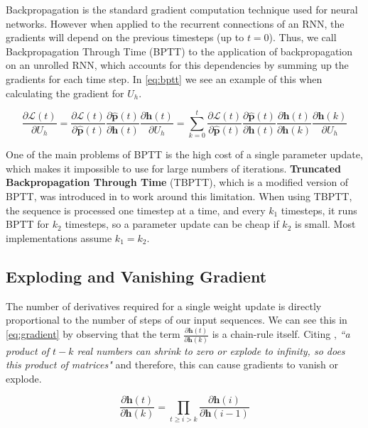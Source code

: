 Backpropagation is the standard gradient computation technique used for neural networks. However when applied to the recurrent connections of an RNN, the gradients will depend on the previous timesteps (up to $t=0$). Thus, we call Backpropagation Through Time (BPTT) \cite{werbos1990backpropagation} to the application of backpropagation on an unrolled RNN, which accounts for this dependencies by summing up the gradients for each time step. In \autoref{eq:bptt} we see an example of this when calculating the gradient for $U_h$.

\begin{equation} \label{eq:bptt}
\frac{\partial \mathcal{L}(t)}{\partial U_h} = \frac{\partial \mathcal{L}(t)}{\partial \mathbf{\hat{p}}(t)}\frac{\partial \mathbf{\hat{p}}(t)}{\partial \mathbf{h}(t)}\frac{\partial \mathbf{h}(t)}{\partial U_h} = \sum_{k=0}^{t} \frac{\partial \mathcal{L}(t)}{\partial \mathbf{\hat{p}}(t)}\frac{\partial \mathbf{\hat{p}}(t)}{\partial \mathbf{h}(t)}\frac{\partial \mathbf{h}(t)}{\partial \mathbf{h}(k)}\frac{\partial \mathbf{h}(k)}{\partial U_h}
\end{equation}

One of the main problems of BPTT is the high cost of a single parameter update, which makes it impossible to use for large numbers of iterations. \textbf{Truncated Backpropagation Through Time} (TBPTT), which is a modified version of BPTT, was introduced in \cite{sutskever2013training} to work around this limitation. When using TBPTT, the sequence is processed one timestep at a time, and every $k_1$ timesteps, it runs BPTT for $k_2$ timesteps, so a parameter update can be cheap if $k_2$ is small. Most implementations assume $k_1=k_2$.

\subsection{Exploding and Vanishing Gradient}

The number of derivatives required for a single weight update is directly proportional to the number of steps of our input sequences. We can see this in \autoref{eq:gradient} by observing that the term $\frac{\partial \mathbf{h}(t)}{\partial \mathbf{h}(k)}$ is a chain-rule itself. Citing \cite{pascanu2013difficulty}, \textit{``a product of $t-k$ real numbers can shrink to zero or explode to infinity, so does this product of matrices"} and therefore, this can cause gradients to vanish or explode. 

\begin{equation} \label{eq:gradient}
	\frac{\partial \mathbf{h}(t)}{\partial \mathbf{h}(k)} = \prod_{t \geq i > k} \frac{\partial \mathbf{h}(i)}{\partial \mathbf{h}(i-1)}
\end{equation}

